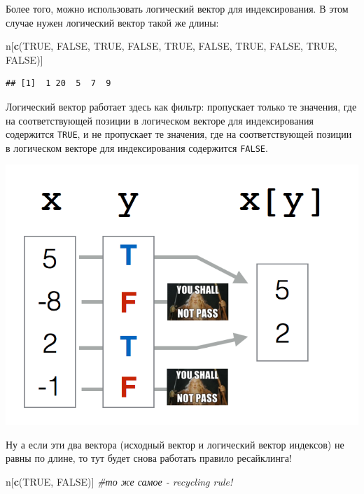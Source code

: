 \documentclass[
]{book}
\newenvironment{Shaded}{\begin{snugshade}}{\end{snugshade}}
\newcommand{\CommentTok}[1]{\textcolor[rgb]{0.56,0.35,0.01}{\textit{#1}}}
\newcommand{\KeywordTok}[1]{\textcolor[rgb]{0.13,0.29,0.53}{\textbf{#1}}}
\newcommand{\NormalTok}[1]{#1}
\newcommand{\OtherTok}[1]{\textcolor[rgb]{0.56,0.35,0.01}{#1}}
\begin{document}
Более того, можно использовать логический вектор для индексирования. В этом случае нужен логический вектор такой же длины:

\begin{Shaded}
\begin{Highlighting}[]
\NormalTok{n[}\KeywordTok{c}\NormalTok{(}\OtherTok{TRUE}\NormalTok{, }\OtherTok{FALSE}\NormalTok{, }\OtherTok{TRUE}\NormalTok{, }\OtherTok{FALSE}\NormalTok{, }\OtherTok{TRUE}\NormalTok{, }\OtherTok{FALSE}\NormalTok{, }\OtherTok{TRUE}\NormalTok{, }\OtherTok{FALSE}\NormalTok{, }\OtherTok{TRUE}\NormalTok{, }\OtherTok{FALSE}\NormalTok{)]}
\end{Highlighting}
\end{Shaded}

\begin{verbatim}
## [1]  1 20  5  7  9
\end{verbatim}

Логический вектор работает здесь как фильтр: пропускает только те значения, где на соответствующей позиции в логическом векторе для индексирования содержится \texttt{TRUE}, и не пропускает те значения, где на соответствующей позиции в логическом векторе для индексирования содержится \texttt{FALSE}.

\includegraphics{images/indexgandolf.png}

Ну а если эти два вектора (исходный вектор и логический вектор индексов) не равны по длине, то тут будет снова работать правило ресайклинга!

\begin{Shaded}
\begin{Highlighting}[]
\NormalTok{n[}\KeywordTok{c}\NormalTok{(}\OtherTok{TRUE}\NormalTok{, }\OtherTok{FALSE}\NormalTok{)] }\CommentTok{#то же самое - recycling rule!}
\end{Highlighting}
\end{Shaded}
\end{document}
